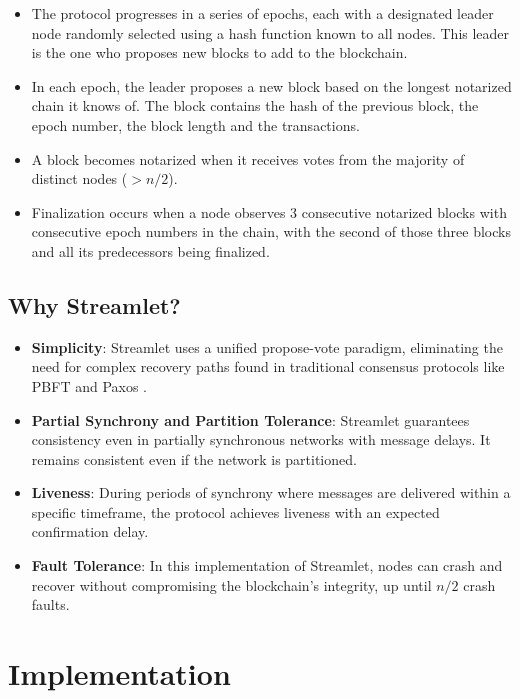 \begin{itemize}
    \item The protocol progresses in a series of epochs, each with a designated leader node randomly selected using a hash function known to all nodes. This leader is the one who proposes new blocks to add to the blockchain.
    \item In each epoch, the leader proposes a new block based on the longest notarized chain it knows of. The block contains the hash of the previous block, the epoch number, the block length and the transactions.
    \item A block becomes notarized when it receives votes from the majority of distinct nodes ($> n/2$).
    \item Finalization occurs when a node observes 3 consecutive notarized blocks with consecutive epoch numbers in the chain, with the second of those three blocks and all its predecessors being finalized.
\end{itemize}

\subsection*{Why Streamlet?}

\begin{itemize}
    \item \textbf{Simplicity}: Streamlet uses a unified propose-vote paradigm, eliminating the need for complex recovery paths found in traditional consensus protocols like PBFT \cite{pbft} and Paxos \cite{paxos}.
    \item \textbf{Partial Synchrony and Partition Tolerance}: Streamlet guarantees consistency even in partially synchronous networks with message delays. It remains consistent even if the network is partitioned.
    \item \textbf{Liveness}: During periods of synchrony where messages are delivered within a specific timeframe, the protocol achieves liveness with an expected confirmation delay.
    \item \textbf{Fault Tolerance}: In this implementation of Streamlet, nodes can crash and recover without compromising the blockchain's integrity, up until $n/2$ crash faults.   
\end{itemize}

\clearpage

\section{Implementation}

